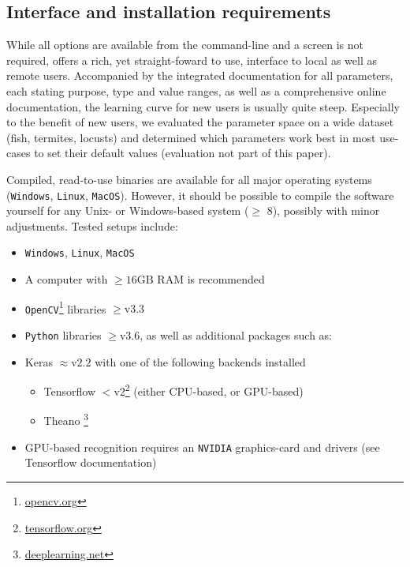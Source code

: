 \documentclass[9pt,lineno]{elife}
\newcommand{\TRex}{\protect\path{TRex}}
\begin{document}
\begin{appendixbox}
\section{Interface and installation requirements}

While all options are available from the command-line and a screen is not required, \TRex{} offers a rich, yet straight-foward to use, interface to local as well as remote users. Accompanied by the integrated documentation for all parameters, each stating purpose, type and value ranges, as well as a comprehensive online documentation, the learning curve for new users is usually quite steep. Especially to the benefit of new users, we evaluated the parameter space on a wide dataset (fish, termites, locusts) and determined which parameters work best in most use-cases to set their default values (evaluation not part of this paper).

Compiled, read-to-use binaries are available for all major operating systems (\texttt{Windows}, \texttt{Linux}, \texttt{MacOS}). However, it should be possible to compile the software yourself for any Unix- or Windows-based system ($\ge$ 8), possibly with minor adjustments. Tested setups include:

\begin{itemize}
    \item \texttt{Windows}, \texttt{Linux}, \texttt{MacOS}
    \item A computer with $\geq 16\mathrm{GB}$ RAM is recommended
    \item \texttt{OpenCV}\footnote{\href{https://opencv.org}{opencv.org}} libraries $\ge \mathrm{v}3.3$
    \item \texttt{Python} libraries $\ge \mathrm{v}3.6$, as well as additional packages such as:
    \item Keras $\approx \mathrm{v}2.2$ with one of the following backends installed
    \begin{itemize}
        \item Tensorflow $<\mathrm{v}2$\footnote{\href{https://tensorflow.org}{tensorflow.org}} (either CPU-based, or GPU-based)
        \item Theano \footnote{\href{http://deeplearning.net/software/theano/}{deeplearning.net}}
    \end{itemize}
    \item GPU-based recognition requires an \texttt{NVIDIA} graphics-card and drivers (see Tensorflow documentation)
    

\end{itemize}
\end{appendixbox}
\end{document}
